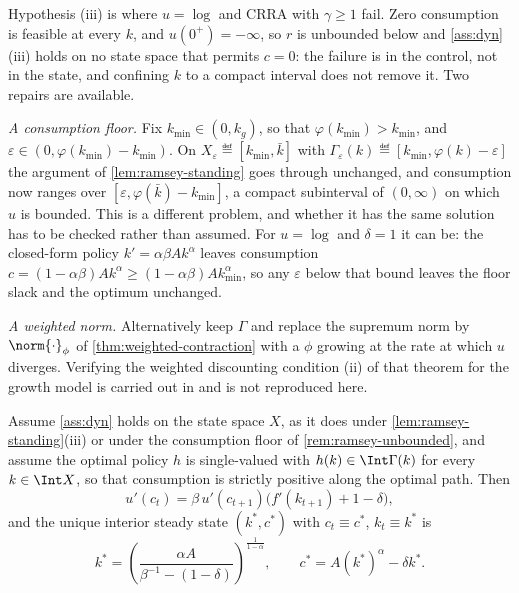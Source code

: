 \begin{remark}\label{rem:ramsey-unbounded}
	Hypothesis (iii) is where $u=\log$ and CRRA with $\gamma\geq1$ fail. Zero
	consumption is feasible at every $k$, and $u(0^{+})=-\infty$, so $r$ is
	unbounded below and \autoref{ass:dyn}(iii) holds on no state space that
	permits $c=0$: the failure is in the control, not in the state, and confining
	$k$ to a compact interval does not remove it. Two repairs are available.

	\emph{A consumption floor.} Fix $k_{\min}\in(0,k_{g})$, so that
	$\varphi(k_{\min})>k_{\min}$, and $\varepsilon\in(0,\varphi(k_{\min})-k_{\min})$.
	On $X_\varepsilon\eqdef[k_{\min},\bar k]$ with
	$\Gamma_\varepsilon(k)\eqdef[k_{\min},\varphi(k)-\varepsilon]$ the argument of
	\autoref{lem:ramsey-standing} goes through unchanged, and consumption now
	ranges over $[\varepsilon,\varphi(\bar k)-k_{\min}]$, a compact subinterval of
	$(0,\infty)$ on which $u$ is bounded. This is a different problem, and whether
	it has the same solution has to be checked rather than assumed. For $u=\log$
	and $\delta=1$ it can be: the closed-form policy $k'=\alpha\beta Ak^{\alpha}$
	leaves consumption $c=(1-\alpha\beta)Ak^{\alpha}\geq(1-\alpha\beta)Ak_{\min}^{\alpha}$,
	so any $\varepsilon$ below that bound leaves the floor slack and the optimum
	unchanged.

	\emph{A weighted norm.} Alternatively keep $\Gamma$ and replace the supremum
	norm by $\norm{\cdot}_{\phi}$ of \autoref{thm:weighted-contraction} with a
	$\phi$ growing at the rate at which $u$ diverges. Verifying the weighted
	discounting condition (ii) of that theorem for the growth model is carried out
	in \textcite[Ch.~4]{stokey1989recursive} and is not reproduced here.
\end{remark}

\begin{proposition}\label{prop:ramsey}
	Assume \autoref{ass:dyn} holds on the state space $X$, as it does under
	\autoref{lem:ramsey-standing}(iii) or under the consumption floor of
	\autoref{rem:ramsey-unbounded}, and assume the optimal policy $h$ is
	single-valued with $h(k)\in\Int\Gamma(k)$ for every $k\in\Int X$, so that
	consumption is strictly positive along the optimal path. Then
	\begin{equation}\label{eq:ramsey-euler}
		u'(c_t)=\beta\,u'(c_{t+1})\bigl(f'(k_{t+1})+1-\delta\bigr),
	\end{equation}
	and the unique interior steady state $(k^{\ast},c^{\ast})$ with
	$c_t\equiv c^{\ast}$, $k_t\equiv k^{\ast}$ is
	\begin{equation}\label{eq:ramsey-steady-state}
		k^{\ast}=\left(\frac{\alpha A}{\beta^{-1}-(1-\delta)}\right)^{\frac{1}{1-\alpha}},
		\qquad
		c^{\ast}=A(k^{\ast})^{\alpha}-\delta k^{\ast}.
	\end{equation}
\end{proposition}

